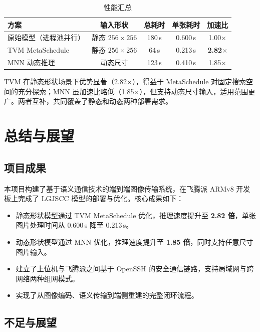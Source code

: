 \documentclass[lang=cn,a4paper,newtx,citestyle=gb7714-2015,bibstyle=gb7714-2015]{elegantpaper}
\begin{document}
\begin{table}[htbp]
\centering
\caption{性能汇总}
\label{tab:perf_summary}
\begin{tabular}{lcccc}
  \toprule
  \textbf{方案} & \textbf{输入形状} & \textbf{总耗时} & \textbf{单张耗时} & \textbf{加速比} \\
  \midrule
  原始模型（进程池并行） & 静态 $256{\times}256$ & 180\,s & 0.600\,s & 1.00$\times$ \\
  TVM MetaSchedule & 静态 $256{\times}256$ & 64\,s & 0.213\,s & \textbf{2.82$\times$} \\
  MNN 动态推理 & 动态尺寸 & 123\,s & 0.410\,s & 1.85$\times$ \\
  \bottomrule
\end{tabular}
\end{table}

TVM 在静态形状场景下优势显著（2.82$\times$），得益于 MetaSchedule 对固定搜索空间的充分探索；MNN 虽加速比略低（1.85$\times$），但支持动态尺寸输入，适用范围更广。两者互补，共同覆盖了静态和动态两种部署需求。

\section{总结与展望}

\subsection{项目成果}

本项目构建了基于语义通信技术的端到端图像传输系统，在飞腾派 ARMv8 开发板上完成了 LGJSCC 模型的部署与优化。核心成果如下：

\begin{itemize}
  \item 静态形状模型通过 TVM MetaSchedule 优化，推理速度提升至 \textbf{2.82 倍}，单张图片处理时间从 0.600\,s 降至 0.213\,s。
  \item 动态形状模型通过 MNN 优化，推理速度提升至 \textbf{1.85 倍}，同时支持任意尺寸图片输入。
  \item 建立了上位机与飞腾派之间基于 OpenSSH 的安全通信链路，支持局域网与跨网络两种组网模式。
  \item 实现了从图像编码、语义传输到端侧重建的完整闭环流程。
\end{itemize}

\subsection{不足与展望}
\end{document}
